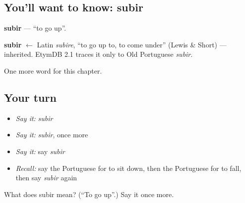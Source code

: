 \subsection*{You'll want to know: subir}
\textbf{subir} — \textquotedblleft{}to go up\textquotedblright{}.

\begin{cousinweb}
\textbf{subir} $\leftarrow$ Latin \emph{subire}, \textquotedblleft{}to go up to, to come under\textquotedblright{} (Lewis \& Short) — inherited. EtymDB 2.1 traces it only to Old Portuguese \emph{subir}.
\end{cousinweb}

\begin{grammarlens}[title={What you've built}]
One more word for this chapter.
\end{grammarlens}

\subsection*{Your turn}
\begin{itemize}
\raggedright
  \item \emph{Say it:} \emph{subir}
  \item \emph{Say it:} \emph{subir}, once more
  \item \emph{Say it:} say \emph{subir}
  \item \emph{Recall:} say the Portuguese for to sit down, then the Portuguese for to fall, then say \emph{subir} again
\end{itemize}

\begin{tcolorbox}[breakable,colback=teal!4,colframe=teal!35!black,title={Before you move on}]
What does subir mean? (\textquotedblleft{}To go up\textquotedblright{}.) Say it once more.
\end{tcolorbox}
